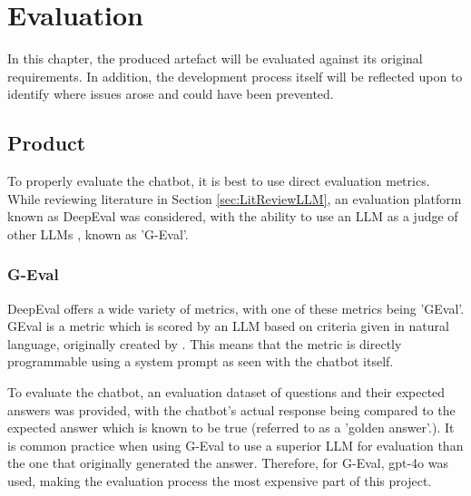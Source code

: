 \chapter{Evaluation}\label{ch:Evaluation}
In this chapter, the produced artefact will be evaluated against its original requirements.
In addition, the development process itself will be reflected upon to identify where issues arose 
and could have been prevented.

\section{Product}


\para To properly evaluate the chatbot, it is best to use direct evaluation metrics. While reviewing literature in Section 
\ref{sec:LitReviewLLM}, an evaluation platform known as DeepEval was considered, with the ability to use an LLM as a judge of 
other LLMs \autocite{deepeval_introduction_2024}, known as 'G-Eval'.

\subsection{G-Eval}\label{sec:DeepEval}
DeepEval offers a wide variety of metrics, with one of these metrics being 'GEval'. GEval is a metric which is scored by an LLM based 
on criteria given in natural language, originally created by \textcite{liuGEvalNLGEvaluation2023a}. This means that the metric is directly 
programmable using a system prompt as seen with the chatbot itself.

\para 
To evaluate the chatbot, an evaluation dataset of questions and their expected answers was provided, with the chatbot's actual response being
compared to the expected answer which is known to be true (referred to as a 'golden answer'.). It is common practice when using G-Eval to use a 
superior LLM for evaluation than the one that originally generated the answer. Therefore, for G-Eval, gpt-4o was used, making the evaluation process 
the most expensive part of this project. 


